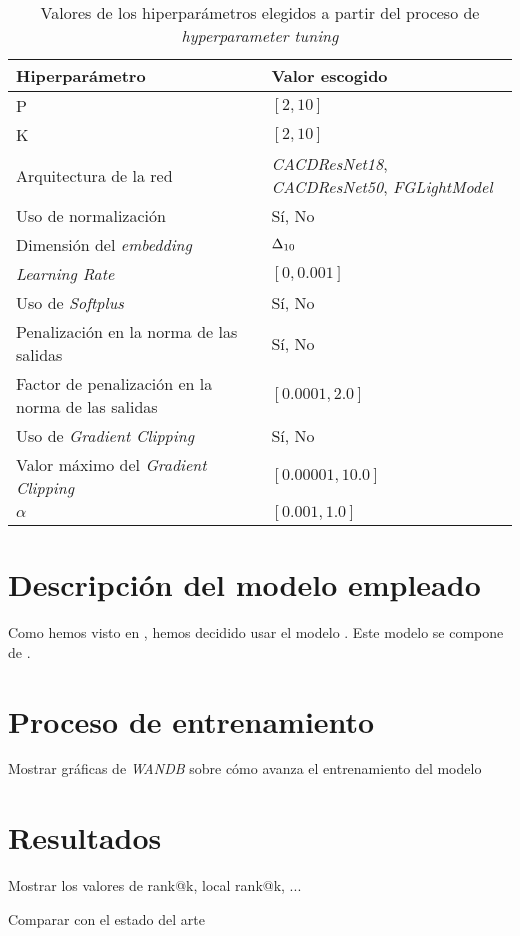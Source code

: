 \begin{table}[H]
\centering
\begin{tabular}{|l|l|}
    \hline
    \textbf{Hiperparámetro} & \textbf{Valor escogido} \\
    \hline

    P & $[2, 10]$ \\
    K & $[2, 10]$ \\
    Arquitectura de la red & \textit{CACDResNet18}, \textit{CACDResNet50}, \textit{FGLightModel} \\
    Uso de normalización & Sí, No \\
    Dimensión del \textit{embedding} & $\Delta_{10}$ \\
    \textit{Learning Rate} & $[0, 0.001]$ \\
    Uso de \textit{Softplus} & Sí, No \\
    Penalización en la norma de las salidas & Sí, No \\
    Factor de penalización en la norma de las salidas & $[0.0001, 2.0]$ \\
    Uso de \textit{Gradient Clipping} & Sí, No \\
    Valor máximo del \textit{Gradient Clipping} & $[0.00001, 10.0]$ \\
    $\alpha$ & $[0.001, 1.0]$ \\

    \hline


\end{tabular}
\caption{Valores de los hiperparámetros elegidos a partir del proceso de \textit{hyperparameter tuning}}
\label{table:hp_escogidos}
\end{table}

\section{Descripción del modelo empleado}

Como hemos visto en , hemos decidido usar el modelo . Este modelo se compone de .

\section{Proceso de entrenamiento}

Mostrar gráficas de \textit{WANDB} sobre cómo avanza el entrenamiento del modelo

\section{Resultados}

Mostrar los valores de rank@k, local rank@k, ...

Comparar con el estado del arte
